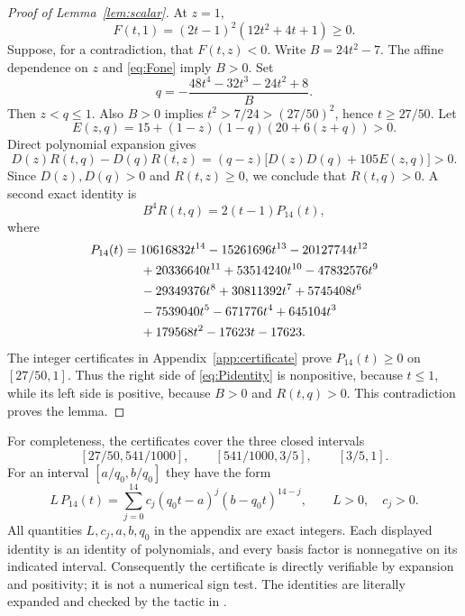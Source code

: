 \documentclass[11pt,a4paper]{article}
\numberwithin{equation}{section}
\theoremstyle{remark}
\newcommand{\Lean}[1]{\texttt{\detokenize{#1}}}
\begin{document}
\begin{proof}[Proof of Lemma~\ref{lem:scalar}]
At $z=1$,
\begin{equation}\label{eq:Fone}
 F(t,1)=(2t-1)^2(12t^2+4t+1)\ge0.
\end{equation}
Suppose, for a contradiction, that $F(t,z)<0$. Write $B=24t^2-7$.
The affine dependence on $z$ and \eqref{eq:Fone} imply $B>0$. Set
\[
 q=-\frac{48t^4-32t^3-24t^2+8}{B}.
\]
Then $z<q\le1$. Also $B>0$ implies
$t^2>7/24>(27/50)^2$, hence $t\ge27/50$.
Let
\[
 E(z,q)=15+(1-z)(1-q)(20+6(z+q))>0.
\]
Direct polynomial expansion gives
\begin{equation}\label{eq:monotonicR}
 D(z)R(t,q)-D(q)R(t,z)
   =(q-z)\bigl[D(z)D(q)+105E(z,q)\bigr]>0.
\end{equation}
Since $D(z),D(q)>0$ and $R(t,z)\ge0$, we conclude that $R(t,q)>0$.
A second exact identity is
\begin{equation}\label{eq:Pidentity}
  B^4R(t,q)=2(t-1)P_{14}(t),
\end{equation}
where
\begin{align}\label{eq:P14}
 P_{14}(t)={}&10616832t^{14}-15261696t^{13}-20127744t^{12}\notag\\
 &+20336640t^{11}+53514240t^{10}-47832576t^9\notag\\
 &-29349376t^8+30811392t^7+5745408t^6\notag\\
 &-7539040t^5-671776t^4+645104t^3\notag\\
 &+179568t^2-17623t-17623.
\end{align}
The integer certificates in Appendix~\ref{app:certificate} prove
$P_{14}(t)\ge0$ on $[27/50,1]$. Thus the right side of
\eqref{eq:Pidentity} is nonpositive, because $t\le1$, while its left side
is positive, because $B>0$ and $R(t,q)>0$. This contradiction proves the
lemma.
\end{proof}

For completeness, the certificates cover the three closed intervals
\[
 [27/50,541/1000],\qquad [541/1000,3/5],\qquad [3/5,1].
\]
For an interval $[a/q_0,b/q_0]$ they have the form
\begin{equation}\label{eq:integercertificate}
 L\,P_{14}(t)=\sum_{j=0}^{14}c_j(q_0t-a)^j(b-q_0t)^{14-j},
 \qquad L>0,\quad c_j>0.
\end{equation}
All quantities $L,c_j,a,b,q_0$ in the appendix are exact integers. Each
displayed identity is an identity of polynomials, and every basis factor
is nonnegative on its indicated interval. Consequently the certificate
is directly verifiable by expansion and positivity; it is not a numerical
sign test. The identities are literally expanded and checked by the
\Lean{ring} tactic in \Lean{ScalarCertificate.lean}.
\end{document}
